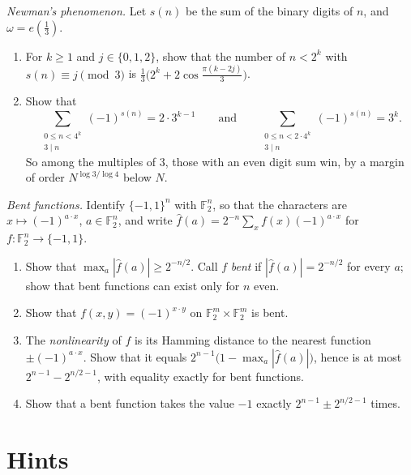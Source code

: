 \begin{exercise}[$\star\star$]\label{pb:newman}
\emph{Newman's phenomenon.} Let $s(n)$ be the sum of the binary digits of $n$, and $\omega=e(\frac13)$.
\begin{enumerate}[label=(\alph*)]
\item For $k\ge1$ and $j\in\{0,1,2\}$, show that the number of $n<2^k$ with $s(n)\equiv j\pmod3$ is $\frac13\bigl(2^k+2\cos\frac{\pi(k-2j)}3\bigr)$.
\item Show that
\[
\sum_{\substack{0\le n<4^k\\3\mid n}}(-1)^{s(n)}=2\cdot3^{k-1}\qquad\text{and}\qquad\sum_{\substack{0\le n<2\cdot4^k\\3\mid n}}(-1)^{s(n)}=3^k.
\]
So among the multiples of $3$, those with an even digit sum win, by a margin of order $N^{\log3/\log4}$ below $N$.
\end{enumerate}
\end{exercise}

\begin{exercise}[$\star\star$]\label{pb:bent}
\emph{Bent functions.} Identify $\{-1,1\}^n$ with $\mathbb F_2^n$, so that the characters are $x\mapsto(-1)^{a\cdot x}$, $a\in\mathbb F_2^n$, and write
$\hat f(a)=2^{-n}\sum_x f(x)(-1)^{a\cdot x}$ for $f:\mathbb F_2^n\to\{-1,1\}$.
\begin{enumerate}[label=(\alph*)]
\item Show that $\max_a|\hat f(a)|\ge2^{-n/2}$. Call $f$ \emph{bent} if $|\hat f(a)|=2^{-n/2}$ for every $a$; show that bent functions can
exist only for $n$ even.
\item Show that $f(x,y)=(-1)^{x\cdot y}$ on $\mathbb F_2^m\times\mathbb F_2^m$ is bent.
\item The \emph{nonlinearity} of $f$ is its Hamming distance to the nearest function $\pm(-1)^{a\cdot x}$. Show that it equals
$2^{n-1}\bigl(1-\max_a|\hat f(a)|\bigr)$, hence is at most $2^{n-1}-2^{n/2-1}$, with equality exactly for bent functions.
\item Show that a bent function takes the value $-1$ exactly $2^{n-1}\pm2^{n/2-1}$ times.
\end{enumerate}
\end{exercise}

\section{Hints}

